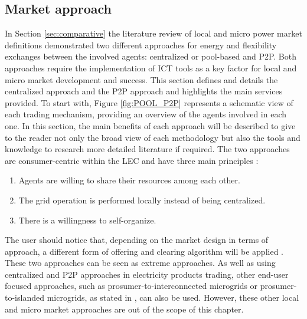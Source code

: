 \subsection{Market approach} \label{sec:marketapproach}

In Section \ref{sec:comparative} the literature review of local and micro power market definitions demonstrated two different
approaches for energy and flexibility exchanges between the involved agents: centralized or pool-based and P2P. Both approaches require the implementation of ICT tools as a key factor for local and micro market development and success. This section defines and details the centralized approach and the P2P approach and highlights the main services provided. To start with, Figure \ref{fig:POOL_P2P} represents a schematic view of each trading mechanism, providing an overview of the agents involved in each one. In this section, the main benefits of each approach will be described to give to the reader not only the broad view of each methodology but also the tools and knowledge to research more detailed literature if required. The two approaches are consumer-centric within the LEC and have three main principles \cite{sousa2018peer}:

\begin{enumerate}
\item Agents are willing to share their resources among each other.
\item The grid operation is performed locally instead of being centralized.
\item There is a willingness to self-organize.
\end{enumerate}

The user should notice that, depending on the market design in terms of approach, a different form of offering and clearing algorithm will be applied \cite{Pinson2017}. These two approaches can be seen as extreme approaches. As well as using centralized and P2P approaches in electricity products trading, other end-user focused approaches, such as prosumer-to-interconnected microgrids or prosumer-to-islanded microgrids, as stated in \cite{parag2016electricity}, can also be used. However, these other local and micro market approaches are out of the scope of this chapter.

